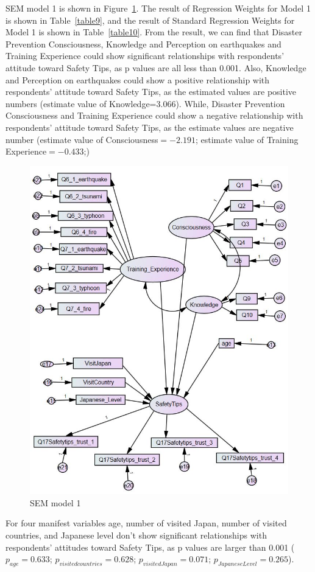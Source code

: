 SEM model 1 is shown in Figure~\ref{fig23}. The result of Regression Weights for Model 1 is shown in Table~\ref{table9}, and the result of Standard Regression Weights for Model 1 is shown in Table~\ref{table10}. From the result, we can find that Disaster Prevention Consciousness, Knowledge and Perception on earthquakes and Training Experience could show significant relationships with respondents' attitude toward Safety Tips, as p values are all less than 0.001. Also, Knowledge and Perception on earthquakes could show a positive relationship with respondents' attitude toward Safety Tips, as the estimated values are positive numbers (estimate value of Knowledge=3.066). While, Disaster Prevention Consciousness and Training Experience could show a negative relationship with respondents' attitude toward Safety Tips, as the estimate values are negative number (estimate value of Consciousness$=-2.191$; estimate value of Training Experience$=-0.433$;) 

\begin{figure}[h]
  \includegraphics[width=0.5\linewidth]{Figure/Figure23.jpg}
  \centering
  \caption{SEM model 1}
  \label{fig23}
\end{figure}

For four manifest variables age, number of visited Japan, number of visited countries, and Japanese level don't show significant relationships with respondents' attitudes toward Safety Tips, as p values are larger than 0.001 ($p_{age} =0.633$; $p_{visitedcountries} =0.628$; $p_{visitedJapan} =0.071$; $p_{JapaneseLevel} =0.265$). 


